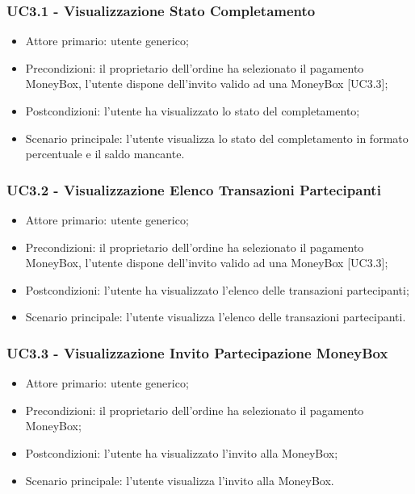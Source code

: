 \subsubsection{UC3.1 - Visualizzazione Stato Completamento}

\begin{itemize}
    \item Attore primario: utente generico;
    \item Precondizioni: il proprietario dell'ordine ha selezionato il pagamento MoneyBox\glo [UC2.2.2], 
            l'utente dispone dell'invito valido ad una MoneyBox\glo{} [UC3.3];
    \item Postcondizioni: l'utente ha visualizzato lo stato del completamento;
    \item Scenario principale: l'utente visualizza lo stato del completamento in formato percentuale e il saldo mancante.
\end{itemize}

\subsubsection{UC3.2 - Visualizzazione Elenco Transazioni Partecipanti}

\begin{itemize}
    \item Attore primario: utente generico;
    \item Precondizioni: il proprietario dell'ordine ha selezionato il pagamento MoneyBox\glo [UC2.2.2], 
            l'utente dispone dell'invito valido ad una MoneyBox\glo{} [UC3.3];
    \item Postcondizioni: l'utente ha visualizzato l'elenco delle transazioni partecipanti;
    \item Scenario principale: l'utente visualizza l'elenco delle transazioni partecipanti.
\end{itemize}

\subsubsection{UC3.3 - Visualizzazione Invito Partecipazione MoneyBox}

\begin{itemize}
    \item Attore primario: utente generico;
    \item Precondizioni: il proprietario dell'ordine ha selezionato il pagamento MoneyBox\glo [UC2.2.2];
    \item Postcondizioni: l'utente ha visualizzato l'invito alla MoneyBox\glo{};
    \item Scenario principale: l'utente visualizza l'invito alla MoneyBox\glo{}.
\end{itemize}

